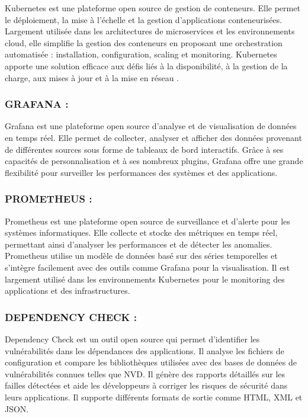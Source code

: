 Kubernetes est une plateforme open source de gestion de conteneurs. Elle permet le déploiement, la mise à l’échelle et la gestion d’applications conteneurisées. Largement utilisée dans les architectures de microservices et les environnements cloud, elle simplifie la gestion des conteneurs en proposant une orchestration automatisée : installation, configuration, scaling et monitoring. Kubernetes apporte une solution efficace aux défis liés à la disponibilité, à la gestion de la charge, aux mises à jour et à la mise en réseau .

\subsubsection{GRAFANA :}

Grafana est une plateforme open source d’analyse et de visualisation de données en temps réel. Elle permet de collecter, analyser et afficher des données provenant de différentes sources sous forme de tableaux de bord interactifs. Grâce à ses capacités de personnalisation et à ses nombreux plugins, Grafana offre une grande flexibilité pour surveiller les performances des systèmes et des applications.

\subsubsection{PROMETHEUS :}

Prometheus est une plateforme open source de surveillance et d’alerte pour les systèmes informatiques. Elle collecte et stocke des métriques en temps réel, permettant ainsi d’analyser les performances et de détecter les anomalies. Prometheus utilise un modèle de données basé sur des séries temporelles et s’intègre facilement avec des outils comme Grafana pour la visualisation. Il est largement utilisé dans les environnements Kubernetes pour le monitoring des applications et des infrastructures.

\subsubsection{DEPENDENCY CHECK :}

Dependency Check est un outil open source qui permet d’identifier les vulnérabilités dans les dépendances des applications. Il analyse les fichiers de configuration et compare les bibliothèques utilisées avec des bases de données de vulnérabilités connues telles que NVD. Il génère des rapports détaillés sur les failles détectées et aide les développeurs à corriger les risques de sécurité dans leurs applications. Il supporte différents formats de sortie comme HTML, XML et JSON.
